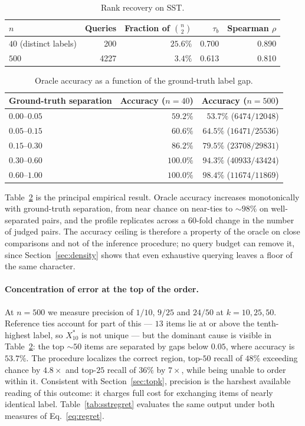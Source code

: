 \documentclass[11pt,a4paper]{article}
\begin{document}
\begin{table}[h]
\centering
\begin{tabular}{lrrrr}
\toprule
$n$ & Queries & Fraction of $\binom{n}{2}$ & $\tau_b$ & Spearman $\rho$ \\
\midrule
$40$ (distinct labels) &  200 & $25.6\%$ & 0.700 & 0.890 \\
$500$                  & 4227 & $3.4\%$  & 0.613 & 0.810 \\
\bottomrule
\end{tabular}
\caption{Rank recovery on SST.}
\label{tab:sst}
\end{table}

\begin{table}[h]
\centering
\begin{tabular}{lrr}
\toprule
Ground-truth separation & Accuracy ($n=40$) & Accuracy ($n=500$) \\
\midrule
$0.00$--$0.05$ & $59.2\%$  & $53.7\%$ \; ($6474/12048$) \\
$0.05$--$0.15$ & $60.6\%$  & $64.5\%$ \; ($16471/25536$) \\
$0.15$--$0.30$ & $86.2\%$  & $79.5\%$ \; ($23708/29831$) \\
$0.30$--$0.60$ & $100.0\%$ & $94.3\%$ \; ($40933/43424$) \\
$0.60$--$1.00$ & $100.0\%$ & $98.4\%$ \; ($11674/11869$) \\
\bottomrule
\end{tabular}
\caption{Oracle accuracy as a function of the ground-truth label gap.}
\label{tab:gap}
\end{table}

Table~\ref{tab:gap} is the principal empirical result. Oracle accuracy increases
monotonically with ground-truth separation, from near chance on near-ties to
${\sim}98\%$ on well-separated pairs, and the profile replicates across a
$60$-fold change in the number of judged pairs. The accuracy ceiling is therefore
a property of the oracle on close comparisons and not of the inference
procedure; no query budget can remove it, since Section~\ref{sec:density} shows
that even exhaustive querying leaves a floor of the same character.

\paragraph{Concentration of error at the top of the order.}
At $n = 500$ we measure precision of $1/10$, $9/25$ and $24/50$ at
$k = 10, 25, 50$. Reference ties account for part of this --- $13$ items lie at
or above the tenth-highest label, so $X_{10}^{*}$ is not unique --- but the
dominant cause is visible in Table~\ref{tab:gap}: the top ${\sim}50$ items are
separated by gaps below $0.05$, where accuracy is $53.7\%$. The procedure
localizes the correct region, top-$50$ recall of $48\%$ exceeding chance by
$4.8\times$ and top-$25$ recall of $36\%$ by $7\times$, while being unable to
order within it. Consistent with Section~\ref{sec:topk}, precision is the
harshest available reading of this outcome: it charges full cost for exchanging
items of nearly identical label. Table~\ref{tab:sstregret} evaluates the same
output under both measures of Eq.~\eqref{eq:regret}.
\end{document}

